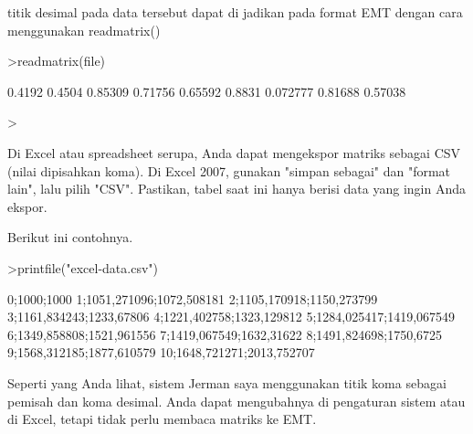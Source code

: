 \documentclass[a4paper,10pt]{article}
\begin{document}
\begin{eulernotebook}
\begin{eulercomment}
\begin{eulercomment}
\begin{eulercomment}
\begin{eulercomment}
\begin{eulercomment}
\begin{eulercomment}
\begin{eulercomment}
\begin{eulercomment}
\begin{euleroutput}
\end{euleroutput}
\begin{eulercomment}
titik desimal pada data tersebut dapat di jadikan pada format EMT
dengan cara menggunakan readmatrix()
\end{eulercomment}
\begin{eulerprompt}
>readmatrix(file)
\end{eulerprompt}
\begin{euleroutput}
     0.4192    0.4504   0.85309 
    0.71756   0.65592    0.8831 
   0.072777   0.81688   0.57038 
\end{euleroutput}
\begin{eulerprompt}
> 
\end{eulerprompt}
\begin{eulercomment}
Di Excel atau spreadsheet serupa, Anda dapat mengekspor matriks
sebagai CSV (nilai dipisahkan koma). Di Excel 2007, gunakan "simpan
sebagai" dan "format lain", lalu pilih "CSV". Pastikan, tabel saat ini
hanya berisi data yang ingin Anda ekspor.

Berikut ini contohnya.
\end{eulercomment}
\begin{eulerprompt}
>printfile("excel-data.csv")
\end{eulerprompt}
\begin{euleroutput}
  0;1000;1000
  1;1051,271096;1072,508181
  2;1105,170918;1150,273799
  3;1161,834243;1233,67806
  4;1221,402758;1323,129812
  5;1284,025417;1419,067549
  6;1349,858808;1521,961556
  7;1419,067549;1632,31622
  8;1491,824698;1750,6725
  9;1568,312185;1877,610579
  10;1648,721271;2013,752707
\end{euleroutput}
\begin{eulercomment}
Seperti yang Anda lihat, sistem Jerman saya menggunakan titik koma
sebagai pemisah dan koma desimal. Anda dapat mengubahnya di pengaturan
sistem atau di Excel, tetapi tidak perlu membaca matriks ke EMT.


\end{eulercomment}
\end{eulercomment}
\end{eulercomment}
\end{eulercomment}
\end{eulercomment}
\end{eulercomment}
\end{eulercomment}
\end{eulercomment}
\end{eulercomment}
\end{eulernotebook}
\end{document}
